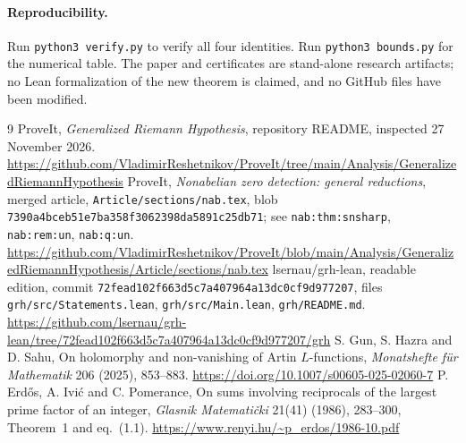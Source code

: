 \documentclass[11pt]{article}
\theoremstyle{remark}
\begin{document}
\paragraph{Reproducibility.} Run \texttt{python3 verify.py} to verify all four identities. Run \texttt{python3 bounds.py} for the numerical table. The paper and certificates are stand-alone research artifacts; no Lean formalization of the new theorem is claimed, and no GitHub files have been modified.

\begin{thebibliography}{9}
 ProveIt, \emph{Generalized Riemann Hypothesis}, repository README, inspected 27 November 2026. \url{https://github.com/VladimirReshetnikov/ProveIt/tree/main/Analysis/GeneralizedRiemannHypothesis}
 ProveIt, \emph{Nonabelian zero detection: general reductions}, merged article, \texttt{Article/sections/nab.tex}, blob \texttt{7390a4bceb51e7ba358f3062398da5891c25db71}; see \texttt{nab:thm:snsharp}, \texttt{nab:rem:un}, \texttt{nab:q:un}. \url{https://github.com/VladimirReshetnikov/ProveIt/blob/main/Analysis/GeneralizedRiemannHypothesis/Article/sections/nab.tex}
 lsernau/grh-lean, readable edition, commit \texttt{72fead102f663d5c7a407964a13dc0cf9d977207}, files \texttt{grh/src/Statements.lean}, \texttt{grh/src/Main.lean}, \texttt{grh/README.md}. \url{https://github.com/lsernau/grh-lean/tree/72fead102f663d5c7a407964a13dc0cf9d977207/grh}
 S. Gun, S. Hazra and D. Sahu, On holomorphy and non-vanishing of Artin $L$-functions, \emph{Monatshefte f\"ur Mathematik} 206 (2025), 853--883. \url{https://doi.org/10.1007/s00605-025-02060-7}
 P. Erd\H{o}s, A. Ivi\'c and C. Pomerance, On sums involving reciprocals of the largest prime factor of an integer, \emph{Glasnik Matemati\v{c}ki} 21(41) (1986), 283--300, Theorem~1 and eq.~(1.1). \url{https://www.renyi.hu/~p_erdos/1986-10.pdf}
\end{thebibliography}
\end{document}
